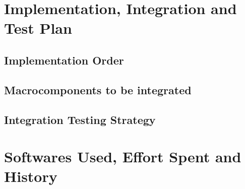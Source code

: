 \documentclass[12pt]{article}
\begin{document}
\section{Implementation, Integration and Test Plan}
\subsection{Implementation Order}

\subsection{Macrocomponents to be integrated}

\subsection{Integration Testing Strategy}

\clearpage
\section{Softwares Used, Effort Spent and History}

\end{document}
